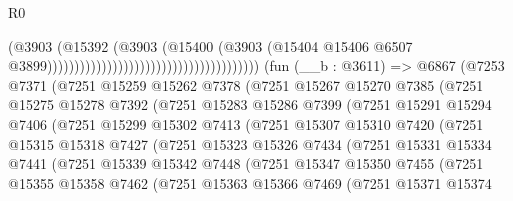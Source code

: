 \begin{lexlean}{R0}
\begin{coremodule}
                                                                      (@3903
                                                                        (@15392
                                                                          (@3903
                                                                            (@15400
                                                                              (@3903
                                                                                (@15404
                                                                                  @15406
                                                                                  @6507
                                                                                  @3899)))))))))))))))))))))))))))))))))))))))
    (fun (__b : @3611) =>
    @6867
      (@7253
        @7371
        (@7251
          @15259
          @15262
          @7378
          (@7251
            @15267
            @15270
            @7385
            (@7251
              @15275
              @15278
              @7392
              (@7251
                @15283
                @15286
                @7399
                (@7251
                  @15291
                  @15294
                  @7406
                  (@7251
                    @15299
                    @15302
                    @7413
                    (@7251
                      @15307
                      @15310
                      @7420
                      (@7251
                        @15315
                        @15318
                        @7427
                        (@7251
                          @15323
                          @15326
                          @7434
                          (@7251
                            @15331
                            @15334
                            @7441
                            (@7251
                              @15339
                              @15342
                              @7448
                              (@7251
                                @15347
                                @15350
                                @7455
                                (@7251
                                  @15355
                                  @15358
                                  @7462
                                  (@7251
                                    @15363
                                    @15366
                                    @7469
                                    (@7251
                                      @15371
                                      @15374

\end{coremodule}
\end{lexlean}

